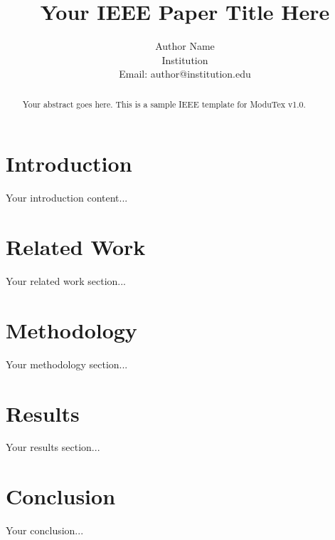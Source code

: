 \documentclass{ieee}
\title{Your IEEE Paper Title Here}
\author{
    Author Name\\
    Institution\\
    Email: author@institution.edu
}
\begin{document}
\maketitle

\begin{abstract}
Your abstract goes here. This is a sample IEEE template for ModuTex v1.0.
\end{abstract}

\section{Introduction}
Your introduction content...

\section{Related Work}
Your related work section...

\section{Methodology}
Your methodology section...

\section{Results}
Your results section...

\section{Conclusion}
Your conclusion...



\end{document}
